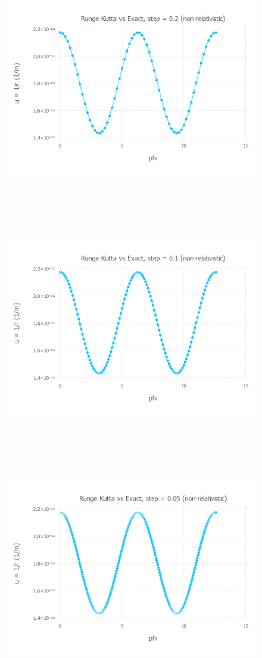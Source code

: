 \documentclass{article}
\begin{document}
\begin{figure}[H]
	\includegraphics[width=6in,height=4in]{"rk4Vexact20"}
\end{figure}
\begin{figure}[H]
	\includegraphics[width=6in,height=4in]{"rk4Vexact10"}
\end{figure}
\begin{figure}[H]
	\includegraphics[width=6in,height=4in]{"rk4Vexact5"}
\end{figure}
\end{document}
